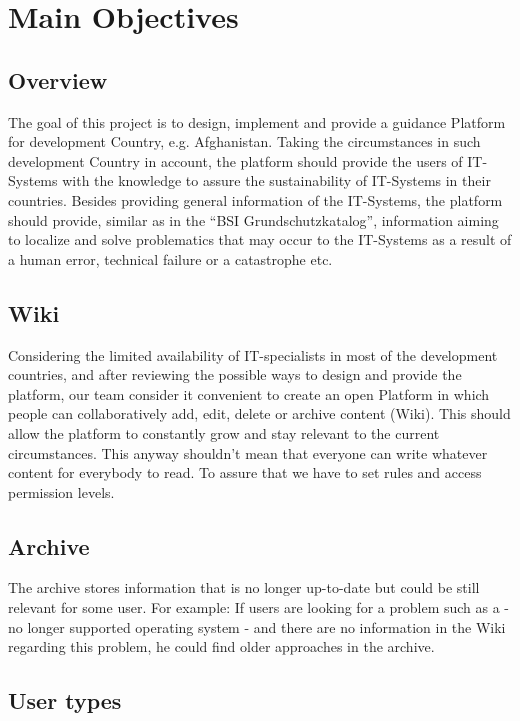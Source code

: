 \chapter{Main Objectives}
\section{Overview}

The goal of this project is to design, implement and provide a guidance Platform for development Country, e.g. Afghanistan. 
Taking the circumstances in such development Country in account, the platform should provide the users of IT-Systems with the knowledge to assure the sustainability of IT-Systems in their countries.
Besides providing general information of the IT-Systems, the platform should provide, similar as in the “BSI Grundschutzkatalog”, information aiming to localize and solve problematics that may occur to the IT-Systems as a result of a human error, technical failure or a catastrophe etc.


\section{Wiki}

Considering the limited availability of IT-specialists in most of the development countries, and after reviewing the possible ways to design and provide the platform, our team consider it convenient to create an open Platform in which people can collaboratively add, edit, delete or archive content (Wiki). 
This should allow the platform to constantly grow and stay relevant to the current circumstances. 
This anyway shouldn’t mean that everyone can write whatever content for everybody to read. 
To assure that we have to set rules and access permission levels.


\section{Archive}

The archive stores information that is no longer up-to-date but could be still relevant for some user. 
For example: If users are looking for a problem such as a - no longer supported operating system - and there are no information in the Wiki regarding this problem, he could find older approaches in the archive.


\section{User types}


